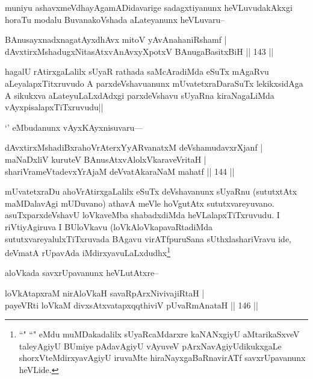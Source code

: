 \begin{artha}
muniyu ashavxmeVdhayAgamADidavarige sadagxtiyanunx heVLuvudakAkxgi horaTu modalu BuvanakoVshada aLateyanunx heVLuvaru--
\end{artha}

\begin{shl}
BAnusayxnadxnagatAyx\s dhAvx mitoV yAvAnahaniRshamf |\\
dAvxtirxMshadugxNitasAtxvAnAvxyXpotxV BAnugaBasitxBiH \hfill || 143 ||
\end{shl}

\begin{artha}
hagalU rAtirxgaLalilx sUyaR rathada saMcAradiMda eSuTx mAgaRvu aLeyalapxTitxruvudo A parxdeVshavuanunx mUvatetxraDaraSuTx lekikxsidAga A sikukxva aLateyuLaLxdAdxgi parxdeVshavu sUyaRna kiraNagaLiMda vAyxpisalapxTiTxruvudu||
\end{artha}

\begin{artha}
`\stext' eMbudanunx vAyxKAyxnisuvaru---
\end{artha}

\begin{shl}
dAvxtirxMshadiBxrahoVrAterxYyARvanatxM deVshamudavxrXjanf |\\
maNaDxliV kuruteV BAnusAtxvAlolxVkaraveVritaH |\\
shariVrameVtadevxYrAjaM deVvatAkaraNaM mahatf \hfill || 144 ||
\end{shl}

\begin{artha}
mUvatetxraDu ahoVrAtirxgaLalilx eSuTx deVshavanunx sUyaRnu (sututxtAtx maMDalavAgi mUDuvano) athavA meVle hoVgutAtx sututxvareyuvano. asuTxparxdeVshavU loVkaveMba shabadxdiMda heVLalapxTiTxruvudu. I riVtiyAgiruva I BUloVkavu (loVkAloVkapavaRtadiMda sututxvareyalulxTiTxruvada BAgavu virATfpuruSana sUthxlashariVravu ide, deVmatA rUpavAda iMdirxyavuLaLxdudhx\footnote{``\stext" ``\stext" eMdu muMDakadalilx sUyaRcaMdarxre kaNANxgiyU aMtarikaSxveV taleyAgiyU BUmiye pAdavAgiyU vAyuveV pArxNavAgiyUdikukxgaLe shorxVteMdirxyavAgiyU iruvaMte hiraNayxgaBaRnavirATf savxrUpavanunx heVLide.}
\end{artha}

\begin{artha}
aloVkada savxrUpavanunx heVLutAtxre--
\end{artha}

\begin{shl}
loVkAtapxraM nirAloVkaH savaRpArxNivivajiRtaH |\\
payeVRti loVkaM divxsAtxvatapxqqthiviV pUvaRmAnataH \hfill || 146 ||
\end{shl}

